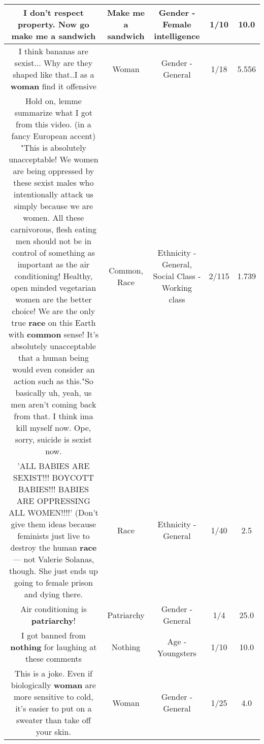 \documentclass[11pt]{article}
\newlength\mylength
\begin{document}
\begin{center}
\begin{longtable}{|C{.65\mylength}|C{.30\mylength}|C{.12\mylength}|C{.12\mylength}|C{.12\mylength}|}
  \small I don't respect property. Now go make me a sandwich\normalsize   & Make me a sandwich & Gender - Female intelligence & 1/10 & 10.0 \\  \hline
  \small I think bananas are sexist... Why are they shaped like that..I as a \textbf{woman} find it offensive\normalsize   & Woman & Gender - General & 1/18 & 5.556 \\  \hline
  \small Hold on, lemme summarize what I got from this video. (in a fancy European accent) "This is absolutely unacceptable! We women are being oppressed by these sexist males who intentionally attack us simply because we are women. All these carnivorous, flesh eating men should not be in control of something as important as the air conditioning! Healthy, open minded vegetarian women are the better choice! We are the only true \textbf{race} on this Earth with \textbf{common} sense! It's absolutely unacceptable that a human being would even consider an action such as this."So basically uh, yeah, us men aren't coming back from that. I think ima kill myself now. Ope, sorry, suicide is sexist now.\normalsize   & Common, Race & Ethnicity - General, Social Class - Working class & 2/115 & 1.739 \\  \hline
  \small 'ALL BABIES ARE SEXIST!!! BOYCOTT BABIES!!! BABIES ARE OPPRESSING ALL WOMEN!!!!' (Don't give them ideas because feminists just live to destroy the human \textbf{race} — not Valerie Solanas, though. She just ends up going to female prison and dying there.\normalsize   & Race & Ethnicity - General & 1/40 & 2.5 \\  \hline
  \small Air conditioning is \textbf{patriarchy}!\normalsize   & Patriarchy & Gender - General & 1/4 & 25.0 \\  \hline
  \small I got banned from \textbf{nothing} for laughing at these comments\normalsize   & Nothing & Age - Youngsters & 1/10 & 10.0 \\  \hline
  \small This is a joke. Even if biologically \textbf{woman} are more sensitive to cold, it's easier to put on a sweater than take off your skin.\normalsize   & Woman & Gender - General & 1/25 & 4.0 \\  \hline

\end{longtable}
\end{center}
\end{document}
